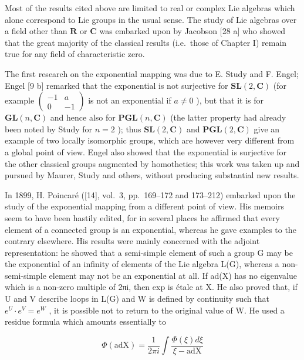 Most of the results cited above are limited to real or complex Lie algebras which alone correspond to Lie groups in the usual sense. The study of Lie algebras over a field other than \(\mathbf{R}\) or \(\mathbf{C}\) was embarked upon by Jacobson {[}28 a{]} who showed that the great majority of the classical results (i.e.~those of Chapter I) remain true for any field of characteristic zero.


The first research on the exponential mapping was due to E. Study and F. Engel; Engel {[}9 b{]} remarked that the exponential is not surjective for \(\mathbf{SL}(2, \mathbf{C})\) (for example \(\begin{pmatrix} -1 & a \\ 0 & -1 \end{pmatrix}\) is not an exponential if \(a \neq 0\) ), but that it is for \(\mathbf{GL}(n, \mathbf{C})\) and hence also for \(\mathbf{PGL}(n, \mathbf{C})\) (the latter property had already been noted by Study for \(n = 2\) ); thus \(\mathbf{SL}(2, \mathbf{C})\) and \(\mathbf{PGL}(2, \mathbf{C})\) give an example of two locally isomorphic groups, which are however very different from a global point of view. Engel also showed that the exponential is surjective for the other classical groups augmented by homotheties; this work was taken up and pursued by Maurer, Study and others, without producing substantial new results.

In 1899, H. Poincaré ({[}14{]}, vol.~3, pp.~169--172 and 173--212) embarked upon the study of the exponential mapping from a different point of view. His memoirs seem to have been hastily edited, for in several places he affirmed that every element of a connected group is an exponential, whereas he gave examples to the contrary elsewhere. His results were mainly concerned with the adjoint representation: he showed that a semi-simple element of such a group G may be the exponential of an infinity of elements of the Lie algebra L(G), whereas a non-semi-simple element may not be an exponential at all. If ad(X) has no eigenvalue which is a non-zero multiple of 2πi, then exp is étale at X. He also proved that, if U and V describe loops in L(G) and W is defined by continuity such that \(e^{U} \cdot e^{V} = e^{W}\) , it is possible not to return to the original value of W. He used a residue formula which amounts essentially to

\[
\Phi (\mathrm{adX}) = \frac {1}{2 \pi i} \int \frac {\Phi (\xi) d \xi}{\xi - \mathrm{adX}}
\]


